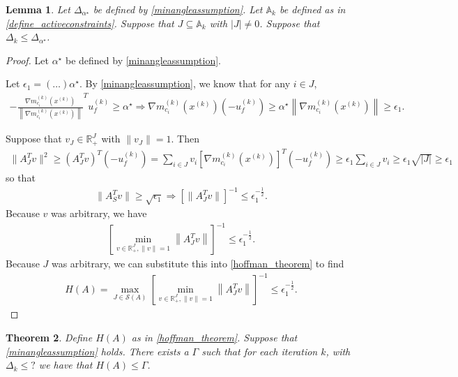 \documentclass{article}
\newtheorem{theorem}{Theorem}[section]
\newtheorem{lemma}[theorem]{Lemma}
\theoremstyle{case}
\numberwithin{theorem}{subsection}
\newcommand{\activeconstraintsk}{{\mathbb A_{k}}}
\newcommand{\dk}{\Delta_k}
\newcommand{\gmcik}{{\nabla m_{c_i}^{(k)}\left(\xk\right)}}
\newcommand{\minanglealpha}{{ \alpha^{\star} }}
\newcommand{\minangledelta}{{\Delta_{\alpha^{\star}}}}
\newcommand{\xk}{{x^{(k)}}}
\newcommand{\minangledirk}{{u^{(k)}_f}}
\begin{document}
\begin{lemma}

Let $\minangledelta$ be defined by \cref{minangleassumption}.
Let $\activeconstraintsk$ be defined as in \cref{define_activeconstraints}.
Suppose that $J \subseteq \activeconstraintsk$ with $|J| \ne 0$.
Suppose that $\dk \le \minangledelta$.
\end{lemma}
\begin{proof}

Let $\minanglealpha$ be defined by \cref{minangleassumption}.



Let $\epsilon_1 = \left(\ldots\right) \minanglealpha$.
By \cref{minangleassumption}, we know that for any $i \in J$,
\begin{align*}
-\frac {\gmcik}{\left\|\gmcik\right\|} ^T\minangledirk \ge \minanglealpha
\Longrightarrow 
\gmcik\left(-\minangledirk \right)\ge \minanglealpha \left\|\gmcik\right\| \ge \epsilon_1.
\end{align*}

Suppose that $v_J \in \mathbb R^J_+$ with $\|v_J\| = 1$.
Then 
\begin{align*}
\|A_J^Tv\|^2 \ge \left(A_J^Tv\right)^T\left(-\minangledirk \right) = \sum_{i \in J} v_i \left[\gmcik\right]^T\left(-\minangledirk \right)
\ge \epsilon_1 \sum_{i \in J} v_i \ge \epsilon_1 \sqrt{|J|} \ge \epsilon_1
\end{align*}
so that 
\begin{align*}
\|A_S^Tv\| \ge \sqrt{\epsilon_1}
\Longrightarrow \left[{\|A_J^Tv\|}\right]^{-1} \le \epsilon_1^{-\frac 1 2}.
\end{align*}
Because $v$ was arbitrary, we have
\begin{align*}
\left[\min_{v \in \mathbb R^J_+, \|v\| = 1}  \left\|A_J^Tv\right\| \right]^{-1} \le \epsilon_1^{-\frac 1 2}.
\end{align*}
Because $J$ was arbitrary, we can substitute this into \cref{hoffman_theorem} to find
\begin{align*}
H(A) = \max_{J \in \mathcal S(A)} \left[\min_{v \in \mathbb R^J_+, \|v\| = 1}  \left\|A_J^Tv\right\| \right]^{-1} \le \epsilon_1^{-\frac 1 2}.
\end{align*}
\end{proof}


\begin{theorem}
\label{bounded_huffman_constant}
Define $H(A)$ as in \cref{hoffman_theorem}.
Suppose that \cref{minangleassumption} holds.
There exists a $\Gamma$ such that for each iteration $k$,
with $\dk \le ?$ we have that $H(A) \le \Gamma$.
\end{theorem}
\end{document}
